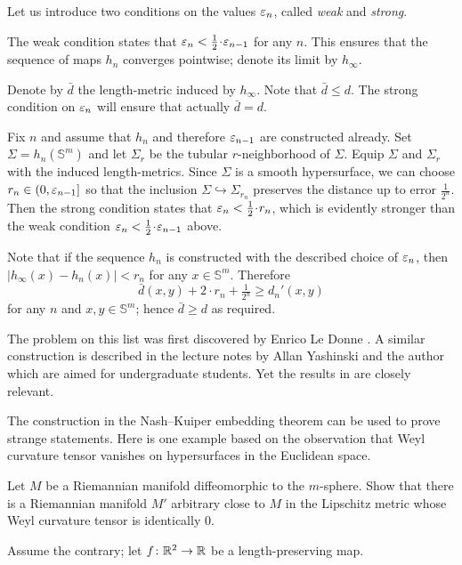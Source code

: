 Let us introduce two conditions on the values $\varepsilon_n$, called \emph{weak} and \emph{strong}.

The weak condition states that $\eps_{n}< \tfrac1{2}\cdot \eps_{n-1}$ for any $n$.
This ensures that the sequence of maps $h_n$ converges pointwise;
denote its limit by $h_\infty$.

Denote by $\bar d$ the length-metric induced by $h_\infty$.
Note that $\bar d\le d$.
The strong condition on $\varepsilon_n$ will ensure that actually $\bar d=d$.

Fix $n$ and assume that $h_n$ and therefore $\varepsilon_{n-1}$ are constructed already.
Set $\Sigma=h_n(\mathbb{S}^m)$
and let $\Sigma_r$ be the tubular $r$-neighborhood of $\Sigma$.
Equip $\Sigma$ and $\Sigma_r$ with the induced length-metrics.
Since $\Sigma$ is a smooth hypersurface, we can choose $r_n\in(0,\varepsilon_{n-1}]$ 
so that the inclusion $\Sigma\hookrightarrow \Sigma_{r_n}$ preserves the distance up to error $\tfrac1{2^n}$.
Then the strong condition states that $\eps_n< \tfrac12\cdot r_n$, 
which is evidently stronger than the weak condition  $\eps_{n}< \tfrac1{2}\cdot \eps_{n-1}$ above.

Note that if the sequence $h_n$ is constructed with the described choice of $\varepsilon_n$,
then $|h_\infty(x)-h_n(x)|<r_n$ for any $x\in\mathbb{S}^m$.
Therefore 
\[\bar d(x,y)+2\cdot r_n+\tfrac1{2^n}\ge d_n'(x,y)\] 
for any $n$ and $x,y\in \mathbb{S}^m$;
hence $\bar d\ge d$ as required. 
\qeds


The problem
on this list was first discovered by Enrico Le Donne \cite{le-donne}.
A similar construction is described in the lecture notes by Allan Yashinski and the author \cite{petrunin-yashinsky} 
which are aimed for undergraduate students. 
Yet the results in \cite{petrunin-paths} are closely relevant.

The construction in the Nash--Kuiper embedding theorem
can be used to prove strange statements.
Here is one example based on the observation that Weyl curvature tensor 
vanishes on hypersurfaces in the Euclidean space.

\begin{pr}
Let $M$ be a Riemannian manifold diffeomorphic to the $m$-sphere. 
Show that there is a Riemannian manifold $M'$ arbitrary close to $M$ in the Lipschitz metric whose Weyl curvature tensor is identically 0.
\end{pr}

Assume the contrary;
let $f\colon\mathbb{R}^2\to \mathbb{R}$ be a length-preserving map.

